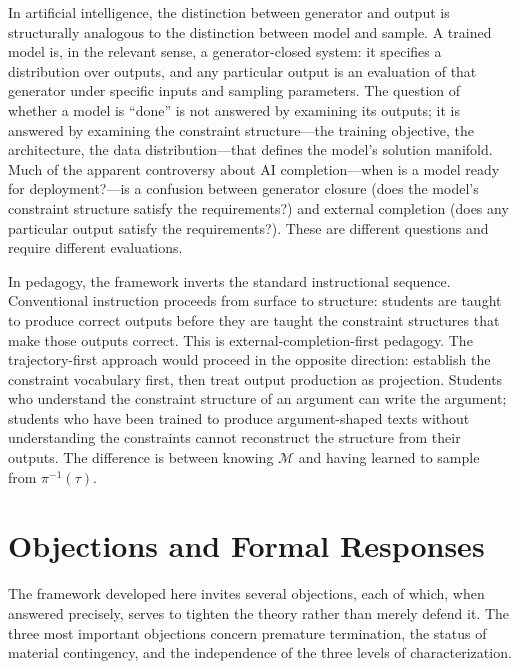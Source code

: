 \documentclass[11pt, twoside]{article}
\theoremstyle{plain}
\theoremstyle{definition}
\theoremstyle{remark}
\begin{document}
In artificial intelligence, the distinction between generator and output is structurally analogous to the distinction between model and sample. A trained model is, in the relevant sense, a generator-closed system: it specifies a distribution over outputs, and any particular output is an evaluation of that generator under specific inputs and sampling parameters. The question of whether a model is ``done'' is not answered by examining its outputs; it is answered by examining the constraint structure---the training objective, the architecture, the data distribution---that defines the model's solution manifold. Much of the apparent controversy about AI completion---when is a model ready for deployment?---is a confusion between generator closure (does the model's constraint structure satisfy the requirements?) and external completion (does any particular output satisfy the requirements?). These are different questions and require different evaluations.

In pedagogy, the framework inverts the standard instructional sequence. Conventional instruction proceeds from surface to structure: students are taught to produce correct outputs before they are taught the constraint structures that make those outputs correct. This is external-completion-first pedagogy. The trajectory-first approach would proceed in the opposite direction: establish the constraint vocabulary first, then treat output production as projection. Students who understand the constraint structure of an argument can write the argument; students who have been trained to produce argument-shaped texts without understanding the constraints cannot reconstruct the structure from their outputs. The difference is between knowing $\mathcal{M}$ and having learned to sample from $\pi^{-1}(\tau)$.

\section{Objections and Formal Responses}
\label{sec:objections}

The framework developed here invites several objections, each of which, when answered precisely, serves to tighten the theory rather than merely defend it. The three most important objections concern premature termination, the status of material contingency, and the independence of the three levels of characterization.
\end{document}

